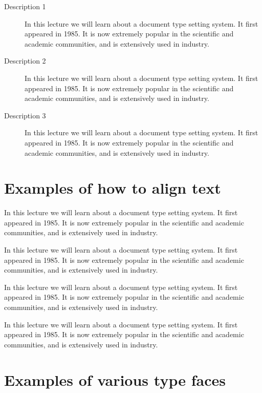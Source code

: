 \documentclass{article}
\begin{document}
\begin{description}
\item [Description 1]In this lecture we will learn about a document type setting system. It first
appeared in 1985. It is now extremely popular in the scientific and academic
communities, and is extensively used in industry.
\item [Description 2]In this lecture we will learn about a document type setting system. It first
appeared in 1985. It is now extremely popular in the scientific and academic
communities, and is extensively used in industry.
\item [Description 3]In this lecture we will learn about a document type setting system. It first
appeared in 1985. It is now extremely popular in the scientific and academic
communities, and is extensively used in industry.
\end{description}

\section{Examples of how to align text}

In this lecture we will learn about a document type setting system. It first
appeared in 1985. It is now extremely popular in the scientific and academic
communities, and is extensively used in industry.

\begin{flushleft}
In this lecture we will learn about a document type setting system. It first
appeared in 1985. It is now extremely popular in the scientific and academic
communities, and is extensively used in industry.
\end{flushleft}

\begin{flushright}
In this lecture we will learn about a document type setting system. It first
appeared in 1985. It is now extremely popular in the scientific and academic
communities, and is extensively used in industry.
\end{flushright}

\begin{center}
In this lecture we will learn about a document type setting system. It first
appeared in 1985. It is now extremely popular in the scientific and academic
communities, and is extensively used in industry.
\end{center}




\section{Examples of various type faces}
\end{document}
